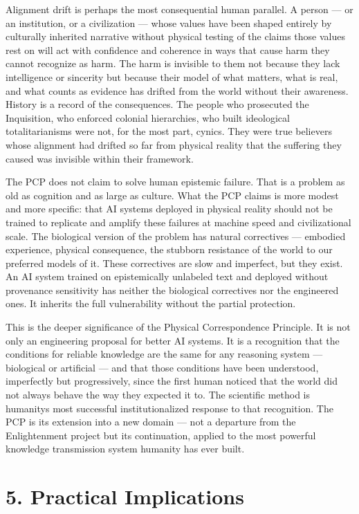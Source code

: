 \documentclass[
]{article}
\begin{document}
Alignment drift is perhaps the most consequential human parallel. A
person --- or an institution, or a civilization --- whose values have
been shaped entirely by culturally inherited narrative without physical
testing of the claims those values rest on will act with confidence and
coherence in ways that cause harm they cannot recognize as harm. The
harm is invisible to them not because they lack intelligence or
sincerity but because their model of what matters, what is real, and
what counts as evidence has drifted from the world without their
awareness. History is a record of the consequences. The people who
prosecuted the Inquisition, who enforced colonial hierarchies, who built
ideological totalitarianisms were not, for the most part, cynics. They
were true believers whose alignment had drifted so far from physical
reality that the suffering they caused was invisible within their
framework.

The PCP does not claim to solve human epistemic failure. That is a
problem as old as cognition and as large as culture. What the PCP claims
is more modest and more specific: that AI systems deployed in physical
reality should not be trained to replicate and amplify these failures at
machine speed and civilizational scale. The biological version of the
problem has natural correctives --- embodied experience, physical
consequence, the stubborn resistance of the world to our preferred
models of it. These correctives are slow and imperfect, but they exist.
An AI system trained on epistemically unlabeled text and deployed
without provenance sensitivity has neither the biological correctives
nor the engineered ones. It inherits the full vulnerability without the
partial protection.

This is the deeper significance of the Physical Correspondence
Principle. It is not only an engineering proposal for better AI systems.
It is a recognition that the conditions for reliable knowledge are the
same for any reasoning system --- biological or artificial --- and that
those conditions have been understood, imperfectly but progressively,
since the first human noticed that the world did not always behave the
way they expected it to. The scientific method is
humanity\textquotesingle s most successful institutionalized response to
that recognition. The PCP is its extension into a new domain --- not a
departure from the Enlightenment project but its continuation, applied
to the most powerful knowledge transmission system humanity has ever
built.

\section{\texorpdfstring{\textbf{5. Practical
Implications}}{5. Practical Implications}}\label{practical-implications}
\end{document}

